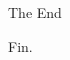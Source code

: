 \documentclass[dvipsnames]{beamer}
\begin{document}
\begin{frame}{The End}
\Huge
\begin{center}
Fin.
\end{center}
\end{frame}


%
%    
%    
%
% 
%    
%
\end{document}
